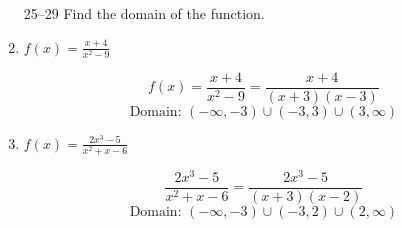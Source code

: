 \documentclass{article}
\begin{document}
\begin{enumerate}
			\item[25--29] Find the domain of the function.

			\item $f(x) = \frac{x + 4}{x^2 - 9} $

				$$ f(x) = \frac{x + 4}{x^2 - 9} = \frac{x + 4}{(x + 3)(x - 3)} $$
				$$ \text{Domain: } (-\infty, -3) \cup (-3, 3) \cup (3, \infty) $$

			\item $f(x) = \frac{2x^3 - 5}{x^2 + x - 6}$
				
				$$ \frac{2x^3 - 5}{x^2 + x - 6} = \frac{2x^3 - 5}{(x + 3)(x - 2)} $$
				$$ \text{Domain: } (-\infty, -3) \cup (-3, 2) \cup (2, \infty) $$
	\end{enumerate}
\end{document}
